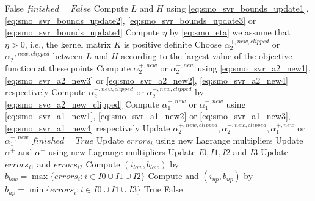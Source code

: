 \begin{breakablealgorithm}
	\newpage
	
	\begin{algorithmic}
				\State \Return False
			\EndIf
			\State $finished = False$
				\State Compute $L$ and $H$ using \eqref{eq:smo_svr_bounds_update1}, \eqref{eq:smo_svr_bounds_update2}, \eqref{eq:smo_svr_bounds_update3} or \eqref{eq:smo_svr_bounds_update4}
					\State Compute $\eta$ by \eqref{eq:smo_eta} \Comment we assume that $\eta > 0$, i.e., the kernel matrix $K$ is positive definite
						\State Choose $\alpha_2^{+,new,clipped}$ or $\alpha_2^{-,new,clipped}$ between $L$ and $H$ according to the largest value of the objective function at these points
					\Else
						\State Compute $\alpha_2^{+,new}$ or $\alpha_2^{-,new}$ using \eqref{eq:smo_svr_a2_new1}, \eqref{eq:smo_svr_a2_new3} or \eqref{eq:smo_svr_a2_new2}, \eqref{eq:smo_svr_a2_new4} respectively
						\State Compute $\alpha_2^{+,new,clipped}$ or $\alpha_2^{-,new,clipped}$ by \eqref{eq:smo_svc_a2_new_clipped}
					\EndIf
					\State Compute $\alpha_1^{+,new}$ or $\alpha_1^{-,new}$ using \eqref{eq:smo_svr_a1_new1}, \eqref{eq:smo_svr_a1_new2} or \eqref{eq:smo_svr_a1_new3}, \eqref{eq:smo_svr_a1_new4} respectively
						\State Update $\alpha_2^{+,new,clipped}, \alpha_2^{-,new,clipped}, \alpha_1^{+,new}$ or $\alpha_1^{-,new}$
					\EndIf
				\Else
					\State $finished = True$
				\EndIf
			\EndWhile
					\State Update $errors_i$ using new Lagrange multipliers
				\EndFor
				\State Update $\alpha^+$ and $\alpha^-$ using new Lagrange multipliers
				\State Update $I0, I1, I2$ and $I3$
				\State Update $errors_{i1}$ and $errors_{i2}$
					\State Compute $(i_{low}, b_{low})$ by $b_{low} = \max\{errors_i : i \in I0 \cup I1 \cup I2\}$
					\State Compute and $(i_{up}, b_{up})$ by $b_{up} = \min\{errors_i : i \in I0 \cup I1 \cup I3\}$
				\EndFor
				\State \Return True
			\Else
				\State \Return False
			\EndIf
		\EndFunction
	\end{algorithmic}
\end{breakablealgorithm}